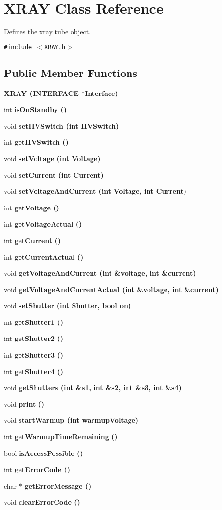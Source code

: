 \section{XRAY Class Reference}
\label{classXRAY}
Defines the xray tube object.  


{\tt \#include $<$XRAY.h$>$}

\subsection*{Public Member Functions}
\begin{CompactItemize}
\item 
\bf{XRAY} (\bf{INTERFACE} $\ast$\bf{Interface})
\item 
int \bf{is\-On\-Standby} ()
\item 
void \bf{set\-HVSwitch} (int HVSwitch)
\item 
int \bf{get\-HVSwitch} ()
\item 
void \bf{set\-Voltage} (int Voltage)
\item 
void \bf{set\-Current} (int Current)
\item 
void \bf{set\-Voltage\-And\-Current} (int Voltage, int Current)
\item 
int \bf{get\-Voltage} ()
\item 
int \bf{get\-Voltage\-Actual} ()
\item 
int \bf{get\-Current} ()
\item 
int \bf{get\-Current\-Actual} ()
\item 
void \bf{get\-Voltage\-And\-Current} (int \&voltage, int \&current)
\item 
void \bf{get\-Voltage\-And\-Current\-Actual} (int \&voltage, int \&current)
\item 
void \bf{set\-Shutter} (int Shutter, bool on)
\item 
int \bf{get\-Shutter1} ()
\item 
int \bf{get\-Shutter2} ()
\item 
int \bf{get\-Shutter3} ()
\item 
int \bf{get\-Shutter4} ()
\item 
void \bf{get\-Shutters} (int \&s1, int \&s2, int \&s3, int \&s4)
\item 
void \bf{print} ()
\item 
void \bf{start\-Warmup} (int warmup\-Voltage)
\item 
int \bf{get\-Warmup\-Time\-Remaining} ()
\item 
bool \bf{is\-Access\-Possible} ()
\item 
int \bf{get\-Error\-Code} ()
\item 
char $\ast$ \bf{get\-Error\-Message} ()
\item 
void \bf{clear\-Error\-Code} ()
\end{CompactItemize}

